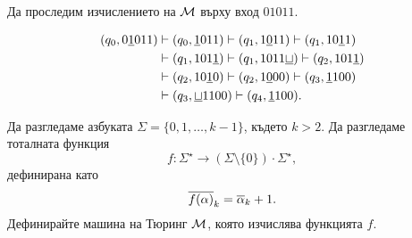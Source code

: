 \begin{example}
Да проследим изчислението на $\mathcal{M}$ върху вход $01011$.

\begin{align*}
  (q_0, 0\underline{1}011) & \vdash (q_0,\underline{1}011) \vdash (q_1, 1\underline{0}11) \vdash (q_1, 10\underline{1}1)\\
                           & \vdash (q_1, 101\underline{1}) \vdash (q_1, 1011\underline{\sqcup}) \vdash (q_2, 101\underline{1})\\
                           & \vdash (q_2, 10\underline{1}0) \vdash (q_2, 1\underline{0}00) \vdash (q_3, \underline{1}100)\\
                           & \vdash (q_3, \underline{\sqcup}1100) \vdash (q_4, \underline{1}100).
\end{align*}
\end{example}


\begin{problem}
  Да разгледаме азбуката $\Sigma = \{0,1,\dots,k-1\}$, където $k > 2$.
  Да разгледаме тоталната функция 
  \[f:\Sigma^\star \to (\Sigma\setminus\{0\})\cdot\Sigma^\star,\]
  дефинирана като
  \[\overline{f(\alpha)}_k = \overline{\alpha}_k + 1.\]
  Дефинирайте машина на Тюринг $\mathcal{M}$, която изчислява функцията $f$.
\end{problem}


